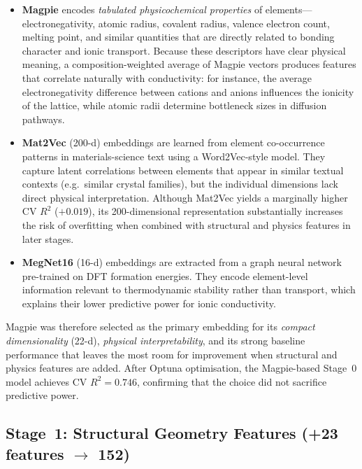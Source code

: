 \documentclass[11pt,a4paper]{article}
\newcommand{\Rtwo}{R^{2}}
\begin{document}
\begin{itemize}[leftmargin=*]
      \item \textbf{Magpie} encodes \emph{tabulated physicochemical properties}
            of elements---electronegativity, atomic radius, covalent radius,
            valence electron count, melting point, and similar quantities that are
            directly related to bonding character and ionic transport.  Because
            these descriptors have clear physical meaning, a composition-weighted
            average of Magpie vectors produces features that correlate naturally
            with conductivity: for instance, the average electronegativity
            difference between cations and anions influences the ionicity of the
            lattice, while atomic radii determine bottleneck sizes in diffusion
            pathways.
      \item \textbf{Mat2Vec} (200-d) embeddings are learned from element
            co-occurrence patterns in materials-science text using a Word2Vec-style
            model.  They capture latent correlations between elements that appear
            in similar textual contexts (e.g.\ similar crystal families), but the
            individual dimensions lack direct physical interpretation.  Although
            Mat2Vec yields a marginally higher CV $\Rtwo$ ($+0.019$), its
            200-dimensional representation substantially increases the risk of
            overfitting when combined with structural and physics features in later
            stages.
      \item \textbf{MegNet16} (16-d) embeddings are extracted from a graph neural
            network pre-trained on DFT formation energies.  They encode
            element-level information relevant to thermodynamic stability rather
            than transport, which explains their lower predictive power for ionic
            conductivity.
\end{itemize}

Magpie was therefore selected as the primary embedding for its \emph{compact
      dimensionality} (22-d), \emph{physical interpretability}, and its strong
baseline performance that leaves the most room for improvement when structural
and physics features are added.  After Optuna optimisation, the Magpie-based
Stage~0 model achieves CV $\Rtwo = 0.746$, confirming that the
choice did not sacrifice predictive power.

\subsection{Stage~1: Structural Geometry Features (+23 features $\to$ 152)}
\end{document}
